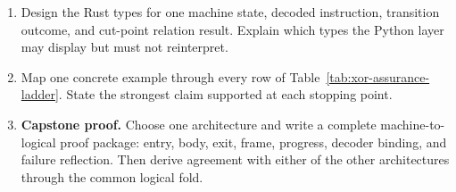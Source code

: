 \begin{enumerate}
\item Design the Rust types for one machine state, decoded instruction,
transition outcome, and cut-point relation result. Explain which types the
Python layer may display but must not reinterpret.

\item Map one concrete example through every row of
Table~\ref{tab:xor-assurance-ladder}. State the strongest claim supported at
each stopping point.

\item \textbf{Capstone proof.} Choose one architecture and write a complete
machine-to-logical proof package: entry, body, exit, frame, progress, decoder
binding, and failure reflection. Then derive agreement with either of the
other architectures through the common logical fold.
\end{enumerate}
